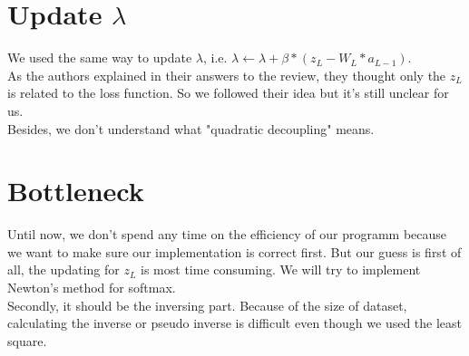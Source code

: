 \documentclass{article}
\begin{document}
\section{Update $\lambda$}
We used the same way to update $\lambda$, i.e. $\lambda \leftarrow \lambda+\beta*(z_L - W_L*a_{L-1})$.\\
As the authors explained in their answers to the review, they thought only the $z_L$ is related to the loss function. So we followed their idea but it's still unclear for us.\\
Besides, we don't understand what "quadratic decoupling" means.

\section{Bottleneck}
Until now, we don't spend any time on the efficiency of our programm because we want to make sure our implementation is correct first. But our guess is first of all, the updating for $z_L$ is most time consuming. We will try to implement Newton's method for softmax.\\
Secondly, it should be the inversing part. Because of the size of dataset, calculating the inverse or pseudo inverse is difficult even though we used the least square.\\
 
\end{document}
